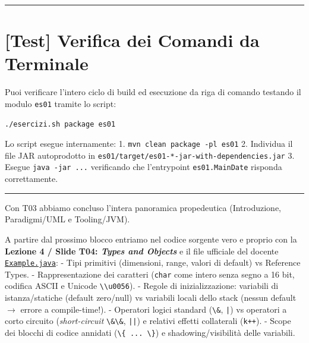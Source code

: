 \documentclass[11pt,a4paper,oneside]{report}
\newcommand{\passthrough}[1]{#1}
\begin{document}
\begin{center}\rule{0.5\linewidth}{0.5pt}\end{center}

\section{{[}Test{]} Verifica dei Comandi da
Terminale}\label{chap03_test-verifica-dei-comandi-da-terminale}

Puoi verificare l'intero ciclo di build ed esecuzione da riga di comando
testando il modulo \passthrough{\lstinline!es01!} tramite lo script:

\begin{lstlisting}[language=bash]
./esercizi.sh package es01
\end{lstlisting}

Lo script esegue internamente: 1.
\passthrough{\lstinline!mvn clean package -pl es01!} 2. Individua il
file JAR autoprodotto in
\passthrough{\lstinline!es01/target/es01-*-jar-with-dependencies.jar!}
3. Esegue \passthrough{\lstinline!java -jar ...!} verificando che
l'entrypoint \passthrough{\lstinline!es01.MainDate!} risponda
correttamente.

\begin{center}\rule{0.5\linewidth}{0.5pt}\end{center}

\begin{studynote} Con T03 abbiamo concluso l'intera panoramica propedeutica
(Introduzione, Paradigmi/UML e Tooling/JVM).

A partire dal prossimo blocco entriamo nel codice sorgente vero e
proprio con la \textbf{Lezione 4 / Slide T04: \emph{Types and Objects}}
e il file ufficiale del docente
\href{file:///home/wally/Documenti/GitHub/Programmazione-II/25-26/Teoria-e-Esercitazioni/Codice-20260902/Lezione04/Example.java}{\passthrough{\lstinline!Example.java!}}:
- Tipi primitivi (dimensioni, range, valori di default) vs Reference
Types. - Rappresentazione dei caratteri (\passthrough{\lstinline!char!}
come intero senza segno a 16 bit, codifica ASCII e Unicode
\passthrough{\lstinline!\\u0056!}). - Regole di inizializzazione:
variabili di istanza/statiche (default zero/null) vs variabili locali
dello stack (nessun default \(\rightarrow\) errore a compile-time!). -
Operatori logici standard (\passthrough{\lstinline!\&!},
\passthrough{\lstinline!|!}) vs operatori a corto circuito
(\emph{short-circuit} \passthrough{\lstinline!\&\&!},
\passthrough{\lstinline!||!}) e relativi effetti collaterali
(\passthrough{\lstinline!k++!}). - Scope dei blocchi di codice annidati
(\passthrough{\lstinline!\{ ... \}!}) e shadowing/visibilità delle
variabili.
\end{studynote}
\end{document}
